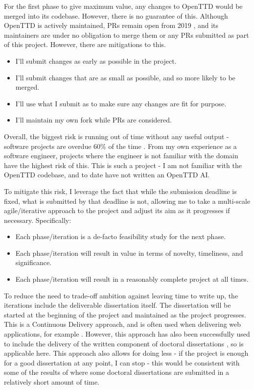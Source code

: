\documentclass[a4paper,11pt]{article}
\begin{document}
For the first phase to give maximum value, any changes to OpenTTD would be merged into its codebase. However, there is no guarantee of this. Although OpenTTD is actively maintained, PRs remain open from 2019 \cite{openTTDPRs}, and its maintainers are under no obligation to merge them or any PRs submitted as part of this project. However, there are mitigations to this.

\begin{itemize}
    \item I'll submit changes as early as possible in the project.
    \item I'll submit changes that are as small as possible, and so more likely to be merged.
    \item I'll use what I submit as to make sure any changes are fit for purpose.
    \item I'll maintain my own fork while PRs are considered.
\end{itemize}

Overall, the biggest risk is running out of time without any useful output - software projects are overdue 60\% of the time \cite{chaos2015}. From my own experience as a software engineer, projects where the engineer is not familiar with the domain have the highest risk of this. This is such a project - I am not familiar with the OpenTTD codebase, and to date have not written an OpenTTD AI.

To mitigate this risk, I leverage the fact that while the submission deadline is fixed, what is submitted by that deadline is not, allowing me to take a multi-scale agile/iterative approach to the project and adjust its aim as it progresses if necessary. Specifically:

\begin{itemize}
    \item Each phase/iteration is a de-facto feasibility study for the next phase.
    \item Each phase/iteration will result in value in terms of novelty, timeliness, and significance.
    \item Each phase/iteration will result in a reasonably complete project at all times.
\end{itemize}

To reduce the need to trade-off ambition against leaving time to write up, the iterations include the deliverable dissertation itself. The dissertation will be started at the beginning of the project and maintained as the project progresses. This is a Continuous Delivery approach, and is often used when delivering web applications, for example \cite{chen_continuous_2015}. However, this approach has also been successfully used to include the delivery of the written component of doctoral dissertations \cite{alipui_agile_nodate}, so is applicable here. This approach also allows for doing less - if the project is enough for a good dissertation at any point, I can stop - this would be consistent with some of the results of \cite{alipui_agile_nodate} where some doctoral dissertations are submitted in a relatively short amount of time.
\end{document}
